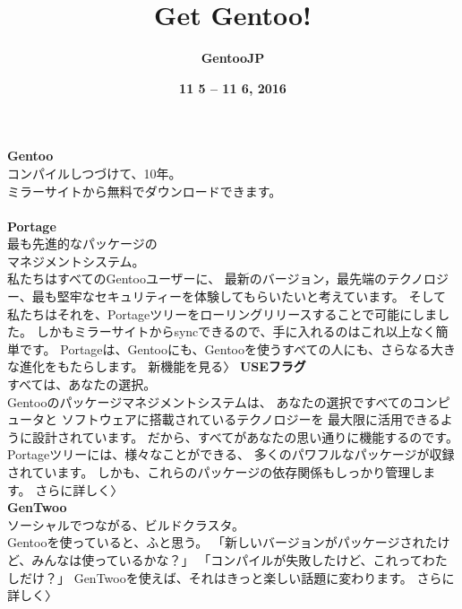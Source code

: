 \documentclass[10pt,foldmark,notumble]{leaflet}
\title{\bf Get Gentoo!}
\author{\bf GentooJP}
\date{\bf 11 5 -- 11 6, 2016 }
\begin{document}
\maketitle

\thispagestyle{empty}

{\centering
	\textcolor{GentooDarkPurple}{
		{\bf \large Gentoo} \\
		{コンパイルしつづけて、10年。} \\
		{\small ミラーサイトから無料でダウンロードできます。} \\
		\vspace{2mm}
		 \\
	}
	\vspace{70mm}
	\textcolor{GentooWhite}{
		{\bf \large Portage} \\
		{最も先進的なパッケージの} \\
		{マネジメントシステム。} \\
		{\small
			私たちはすべてのGentooユーザーに、
			最新のバージョン，最先端のテクノロジー、最も堅牢なセキュリティーを体験してもらいたいと考えています。
			そして私たちはそれを、Portageツリーをローリングリリースすることで可能にしました。
			しかもミラーサイトからsyncできるので、手に入れるのはこれ以上なく簡単です。
			Portageは、Gentooにも、Gentooを使うすべての人にも、さらなる大きな進化をもたらします。
			新機能を見る〉
		}
	}
}
\newpage
{\centering
	\textcolor{GentooBlack}{
		{\bf \large USEフラグ} \\
		{すべては、あなたの選択。} \\
		{\small
			Gentooのパッケージマネジメントシステムは、
			あなたの選択ですべてのコンピュータと
			ソフトウェアに搭載されているテクノロジーを
			最大限に活用できるように設計されています。
			だから、すべてがあなたの思い通りに機能するのです。
			Portageツリーには、様々なことができる、
			多くのパワフルなパッケージが収録されています。
			しかも、これらのパッケージの依存関係もしっかり管理します。
			さらに詳しく〉
		} \\
	}
}
\newpage
{\centering
	\textcolor{GentooBlack}{
		{\bf \large GenTwoo} \\
		{ソーシャルでつながる、ビルドクラスタ。} \\
		{\small
			Gentooを使っていると、ふと思う。
			「新しいバージョンがパッケージされたけど、みんなは使っているかな？」
			「コンパイルが失敗したけど、これってわたしだけ？」
			GenTwooを使えば、それはきっと楽しい話題に変わります。
			さらに詳しく〉
		} \\
	}
}
\newpage
\end{document}
